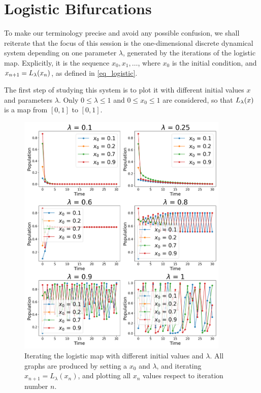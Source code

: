 \section{Logistic Bifurcations}

To make our terminology precise and avoid any possible confusion, we shall reiterate that the focus of this session is the one-dimensional discrete dynamical system depending on one parameter $\lambda$, generated by the iterations of the logistic map. 
Explicitly, it is the sequence $x_0, x_1, \dots$, where $x_0$ is the initial condition, and $x_{n+1} = L_{\lambda}(x_n)$, as defined in \eqref{eq_logistic}.

The first step of studying this system is to plot it with different initial values $x$ and parameters $\lambda$. Only $0 \leq \lambda \leq 1$ and $0 \leq x_0 \leq 1$ are considered, so that $L_{\lambda}(x)$ is a map from $[0,1]$ to $[0,1]$. 

\begin{figure}[htbp]
	\centering
	\includegraphics[width=0.9\textwidth]{./figures/various_iterating_logistic_map.png}
	\caption{Iterating the logistic map with different initial values and $\lambda$. All graphs are produced by setting a $x_0$ and $\lambda$, and iterating $x_{n+1} = L_{\lambda}(x_n)$, and plotting all $x_n$ values respect to iteration number $n$.}
	\label{fig:various_iter_logistic}
\end{figure}

